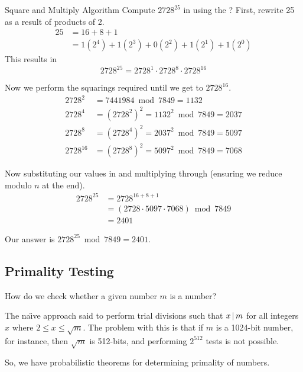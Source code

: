 \begin{example}{Square and Multiply Algorithm}
  Compute $2728^{25}$ in  using the ?
  \tcblower{}
  First, rewrite 25 as a result of products of 2.
  \begin{align*}
    25 &= 16 + 8 + 1 \\
    &= 1 (2^{4}) + 1 (2^{3}) + 0 (2^{2}) + 1 (2^{1}) + 1 (2^{0})
  \end{align*}
  This results in
  \begin{equation*}
    2728^{25} = 2728^{1} \cdot 2728^{8} \cdot 2728^{16}
  \end{equation*}

  Now we perform the squarings required until we get to $2728^{16}$.
  \begin{align*}
    2728^{2} &= 7441984 \bmod 7849 = 1132 \\
    2728^{4} &= {(2728^{2})}^{2} = 1132^{2} \bmod 7849 = 2037 \\
    2728^{8} &= {(2728^{4})}^{2} = 2037^{2} \bmod 7849 = 5097 \\
    2728^{16} &= {(2728^{8})}^{2} = 5097^{2} \bmod 7849 = 7068
  \end{align*}

  Now substituting our values in and multiplying through (ensuring we reduce modulo $n$ at the end).
  \begin{align*}
    2728^{25} &= 2728^{16+8+1} \\
              &= (2728 \cdot 5097 \cdot 7068) \bmod 7849 \\
              &= 2401
  \end{align*}

  Our answer is $2728^{25} \bmod 7849 = 2401$.
\end{example}

\subsection{Primality Testing}\label{subsec:Primality_Testing}
How do we check whether a given number $m$ is a  number?

The na\"{\i}ve approach said to perform trial divisions such that $x \operatorname{\vert} m$ for all integers $x$ where $2 \leq x \leq \sqrt{m}$.
The problem with this is that if $m$ is a 1024-bit number, for instance, then $\sqrt{m}$ is 512-bits, and performing $2^{512}$ tests is not possible.

So, we have probabilistic theorems for determining primality of numbers.

